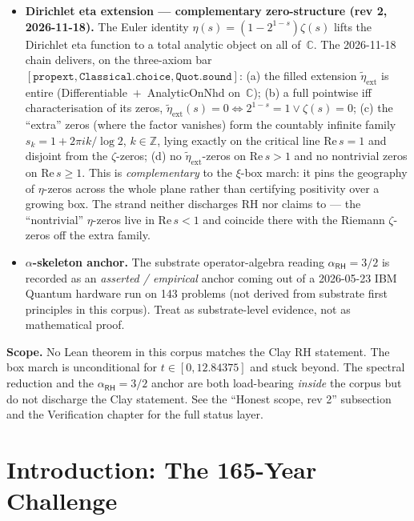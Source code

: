 \begin{chapterobjectives}
\begin{itemize}
\item \textbf{Dirichlet eta extension — complementary zero-structure
(rev 2, 2026-11-18).}  The Euler identity
$\eta(s) = (1 - 2^{1-s}) \zeta(s)$ lifts the Dirichlet eta function
to a total analytic object on all of~$\mathbb{C}$.  The 2026-11-18
chain delivers, on the three-axiom bar
$[\mathtt{propext}, \mathtt{Classical.choice}, \mathtt{Quot.sound}]$:
(a) the filled extension $\widetilde{\eta}_{\mathrm{ext}}$ is entire
(Differentiable~$+$~AnalyticOnNhd on~$\mathbb{C}$); (b) a full
pointwise iff characterisation of its zeros,
$\widetilde{\eta}_{\mathrm{ext}}(s) = 0 \iff 2^{1-s} = 1 \lor
\zeta(s) = 0$; (c) the ``extra'' zeros (where the factor vanishes)
form the countably infinite family
$s_k = 1 + 2\pi i k / \log 2$, $k \in \mathbb{Z}$, lying exactly on
the critical line $\mathrm{Re}\,s = 1$ and disjoint from the
$\zeta$-zeros; (d) no $\widetilde{\eta}_{\mathrm{ext}}$-zeros on
$\mathrm{Re}\,s > 1$ and no nontrivial zeros on $\mathrm{Re}\,s \ge 1$.
This is \emph{complementary} to the $\xi$-box march: it pins the
geography of $\eta$-zeros across the whole plane rather than
certifying positivity over a growing box.  The strand neither
discharges RH nor claims to --- the ``nontrivial'' $\eta$-zeros
live in $\mathrm{Re}\,s < 1$ and coincide there with the Riemann
$\zeta$-zeros off the extra family.
\item \textbf{$\alpha$-skeleton anchor.}  The substrate operator-algebra reading $\alpha_{\textsf{RH}} = 3/2$ is recorded as an \emph{asserted / empirical} anchor coming out of a 2026-05-23 IBM Quantum hardware run on 143 problems (not derived from substrate first principles in this corpus).  Treat as substrate-level evidence, not as mathematical proof.
\end{itemize}

\textbf{Scope.}  No Lean theorem in this corpus matches the Clay RH statement.  The box march is unconditional for $t \in [0, 12.84375]$ and stuck beyond.  The spectral reduction and the $\alpha_{\textsf{RH}} = 3/2$ anchor are both load-bearing \emph{inside} the corpus but do not discharge the Clay statement.  See the ``Honest scope, rev 2'' subsection and the Verification chapter for the full status layer.
\end{chapterobjectives}

\section{Introduction: The 165-Year Challenge}

